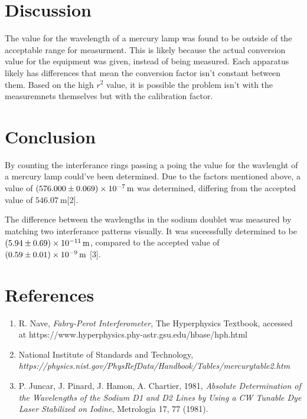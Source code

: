 \documentclass{article}
\begin{document}
    \section{Discussion}
        The value for the wavelength of a mercury lamp was found to be outside of the acceptable range for measurment. This is likely because the actual conversion value for the equipment was given, instead of being measured. Each apparatus likely has differences that mean the conversion factor isn't constant between them. Based on the high $r^2$ value, it is possible the problem isn't with the measuremnets themselves but with the calibration factor.
    \section{Conclusion}
        By counting the interferance rings passing a poing the value for the wavlenght of a mercury lamp could've been determined. Due to the factors mentioned above, a value of $\qty{576(0.069)E-7}{\m}$ was determined, differing from the accepted value of $\qty{546.07}{\m}$[2].

        The difference between the wavlengths in the sodium doublet was measured by matching two interferance patterns visually. It was suceessfully determined to be $\qty{5.94(0.69)E-11}{\m}$, compared to the accepted value of  $\qty{0.59(0.01)E-9}{\m}$ [3].
    \section{References}
    \begin{enumerate}
        \item R. Nave, \emph{Fabry-Perot Interferometer}, The Hyperphysics Textbook, accessed at https://www.hyperphysics.phy-astr.gsu.edu/hbase/hph.html
        \item National Institute of Standards and Technology, \\
        \emph{https://physics.nist.gov/PhysRefData/Handbook/Tables/mercurytable2.htm}
        \item P. Juncar, J. Pinard, J. Hamon, A. Chartier, 1981, \emph{Absolute Determination of the Wavelengths of the Sodium D1 and D2 Lines by Using a CW Tunable Dye Laser Stabilized on Iodine}, Metrologia 17, 77 (1981).
    \end{enumerate}
\end{document}
